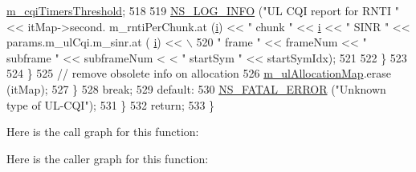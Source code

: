 \begin{DoxyCode}
      \hyperlink{classns3_1_1MmWaveFlexTtiMaxRateMacScheduler_a7f29b65f1e4a7c64cf73fe2efd02770f}{m\_cqiTimersThreshold};
518 
519                                         \hyperlink{group__logging_gafbd73ee2cf9f26b319f49086d8e860fb}{NS\_LOG\_INFO} (\textcolor{stringliteral}{"UL CQI report for RNTI "} << itMap->second.
      m\_rntiPerChunk.at (\hyperlink{bernuolliDistribution_8m_a6f6ccfcf58b31cb6412107d9d5281426}{i}) << \textcolor{stringliteral}{" chunk "} << \hyperlink{bernuolliDistribution_8m_a6f6ccfcf58b31cb6412107d9d5281426}{i} << \textcolor{stringliteral}{" SINR "} << params.m\_ulCqi.m\_sinr.at (
      \hyperlink{bernuolliDistribution_8m_a6f6ccfcf58b31cb6412107d9d5281426}{i}) << \(\backslash\)
520                                                      \textcolor{stringliteral}{" frame "} << frameNum << \textcolor{stringliteral}{" subframe "} << subframeNum <
      < \textcolor{stringliteral}{" startSym "} << startSymIdx);
521 
522                                 \}
523 
524                         \}
525                         \textcolor{comment}{// remove obsolete info on allocation}
526                         \hyperlink{classns3_1_1MmWaveFlexTtiMaxRateMacScheduler_af147a6545a940d5bd3394db2054582ab}{m\_ulAllocationMap}.erase (itMap);
527                 \}
528                 \textcolor{keywordflow}{break};
529                 \textcolor{keywordflow}{default}:
530                         \hyperlink{group__fatal_ga5131d5e3f75d7d4cbfd706ac456fdc85}{NS\_FATAL\_ERROR} (\textcolor{stringliteral}{"Unknown type of UL-CQI"});
531         \}
532         \textcolor{keywordflow}{return};
533 \}
\end{DoxyCode}


Here is the call graph for this function\+:




Here is the caller graph for this function\+:


